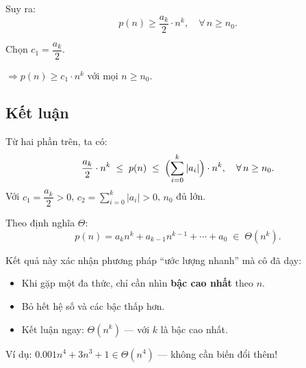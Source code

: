 \documentclass[12pt,a4paper]{article}
\begin{document}
Suy ra:
\[
  p(n) \geq \frac{a_k}{2} \cdot n^k, \quad \forall\, n \geq n_0.
\]

Chọn $c_1 = \dfrac{a_k}{2}$.

$\Longrightarrow p(n) \geq c_1 \cdot n^k$ với mọi $n \geq n_0$. \checkmark

\subsection*{Kết luận}

\begin{resultbox}
Từ hai phần trên, ta có:
\[
  \frac{a_k}{2} \cdot n^k \;\leq\; p(n) \;\leq\; \Bigl(\sum_{i=0}^{k}|a_i|\Bigr) \cdot n^k, \quad \forall\, n \geq n_0.
\]
Với $c_1 = \dfrac{a_k}{2} > 0$, \; $c_2 = \displaystyle\sum_{i=0}^{k}|a_i| > 0$, \; $n_0$ đủ lớn.

Theo định nghĩa $\Theta$:
\[
  \boxed{p(n) = a_k n^k + a_{k-1}n^{k-1} + \cdots + a_0 \;\in\; \Theta(n^k).}
\]
\end{resultbox}

\begin{notebox}[title={Ý nghĩa thực tiễn (theo cô Thương)}]
Kết quả này xác nhận phương pháp ``ước lượng nhanh'' mà cô đã dạy:
\begin{itemize}
  \item Khi gặp một đa thức, chỉ cần nhìn \textbf{bậc cao nhất} theo $n$.
  \item Bỏ hết hệ số và các bậc thấp hơn.
  \item Kết luận ngay: $\Theta(n^k)$ --- với $k$ là bậc cao nhất.
\end{itemize}
Ví dụ: $0.001n^4 + 3n^3 + 1 \in \Theta(n^4)$ --- không cần biến đổi thêm!
\end{notebox}
\end{document}
